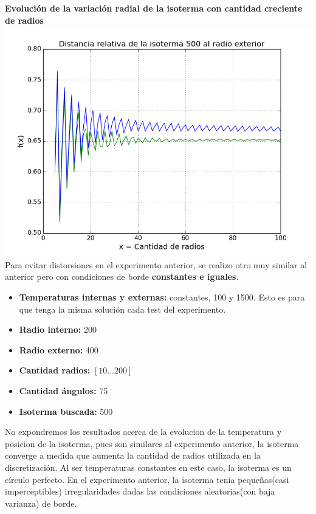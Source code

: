 \begin{enumerate}
	\textbf{Evolución de la variación radial de la isoterma con cantidad creciente de radios}\\
	\includegraphics[scale=0.5]{experimentos1a_1b/evolucion_estimacion_seguridad_isoterma/100ang_5to100radios.png}\\


Para evitar distorsiones en el experimento anterior, se realizo otro muy similar al anterior pero con condiciones de borde \textbf{constantes e iguales}.
\begin{itemize}
	\item \textbf{Temperaturas internas y externas:} constantes, 100 y 1500. Esto es para que tenga la misma solución cada test del experimento.
	\item \textbf{Radio interno:} 200
	\item \textbf{Radio externo:} 400
	\item \textbf{Cantidad radios:} $[10\dots200]$
	\item \textbf{Cantidad ángulos:} 75
	\item \textbf{Isoterma buscada:} 500
\end{itemize}

No expondremos los resultados acerca de la evolucion de la temperatura y posicion de la isoterma, pues son similares al experimento anterior, la isoterma converge a medida que aumenta la cantidad de radios utilizada en la discretización. Al ser temperaturas constantes en este caso, la isoterma es un círculo perfecto. En el experimento anterior, la isoterma tenia pequeñas(casi imperceptibles) irregularidades dadas las condiciones aleatorias(con baja varianza) de borde.


\end{enumerate}
